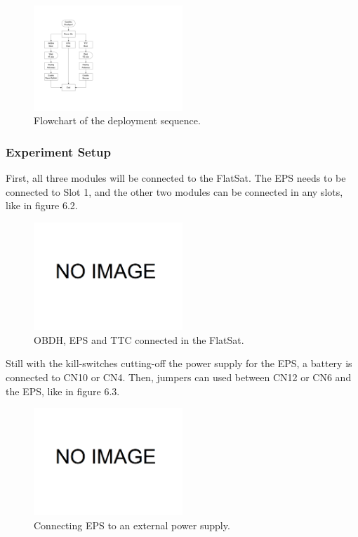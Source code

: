 \begin{figure}[H]
	\begin{center}
		\includegraphics[width=0.5\textwidth]{figures/deployment-flowchart.pdf}
		\caption{Flowchart of the deployment sequence.}
		\label{fig:deployment-flowchart}
	\end{center}
\end{figure}

\subsubsection{Experiment Setup}

First, all three modules will be connected to the FlatSat. The EPS needs to be connected to Slot 1, and the other two modules can be connected in any slots, like in figure 6.2.

\begin{figure}[H]
	\begin{center}
		\includegraphics[width=0.5\textwidth]{figures/dummy-image.png}
		\caption{OBDH, EPS and TTC connected in the FlatSat.}
		\label{fig:connections-1}
	\end{center}
\end{figure}

Still with the kill-switches cutting-off the power supply for the EPS, a battery is connected to CN10 or CN4. Then, jumpers can used between CN12 or CN6 and the EPS, like in figure 6.3.  

\begin{figure}[H]
	\begin{center}
		\includegraphics[width=0.5\textwidth]{figures/dummy-image.png}
		\caption{Connecting EPS to an external power supply.}
		\label{fig:connections-1}
	\end{center}
\end{figure}

